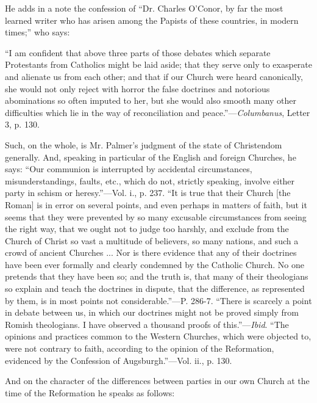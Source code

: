 He adds in a note the confession of ``Dr. Charles
O'Conor, by far the most learned writer who has arisen among the
Papists of these countries, in modern times;'' who says:

``I
am confident that above three parts of those debates which separate
Protestants from Catholics might be laid aside; that they serve only
to exasperate and alienate us from each other; and that if our Church
were heard canonically, she would not only reject with horror the
false doctrines and notorious abominations so often imputed to her,
but she would also smooth many other difficulties which lie in the way
of reconciliation and peace.''—\emph{Columbanus}, Letter 3, p. 130.

Such, on the whole, is Mr. Palmer's judgment of
the state of Christendom generally. And, speaking in particular of the
English and foreign Churches, he says: ``Our communion is interrupted
by accidental circumstances, misunderstandings, faults, etc., which do
not, strictly speaking, involve either party in schism or heresy.''—Vol. i., p. 237. ``It is true that their Church [the Roman]
is in error on several points, and even perhaps in matters of faith,
but it seems that they were prevented by so many excusable
circumstances from seeing the right way, that we ought not to judge
too harshly, and exclude from the Church of Christ so vast a multitude
of believers, so many nations, and such a crowd of ancient Churches
... Nor is there evidence that any of their doctrines have been ever
formally and clearly condemned by the Catholic Church. No one pretends
that they have been so; and the truth is, that many of their
theologians so explain and teach the doctrines in dispute, that the
difference, as represented by them, is in most points not
considerable.''—P. 286-7. ``There is scarcely a point in debate
between us, in which our doctrines might not be proved simply from
Romish theologians. I have observed a thousand proofs of this.''—\emph{Ibid}.
``The opinions and practices common to the Western Churches, which were
objected to, were not contrary to faith, according to the opinion of
the Reformation, evidenced by the Confession of Augsburgh.''—Vol.
ii., p. 130.

And on the character of the differences between
parties in our own Church at the time of the Reformation he speaks as
follows:

